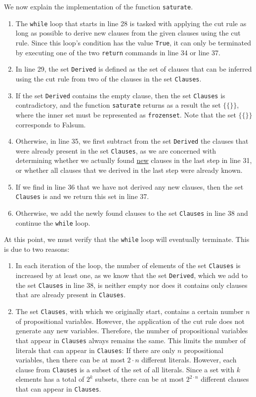 We now explain the implementation of the function \texttt{saturate}.
\begin{enumerate}
\item The \texttt{while} loop that starts in line 28 is tasked with applying the cut rule
      as long as possible to derive new clauses from the given
      clauses using the cut rule. Since this loop's condition has the value \texttt{True}, it can only be
      terminated by executing one of the two \texttt{return} commands in line 34 or line 37.
\item In line 29, the set \texttt{Derived} is defined as the set of clauses that can be inferred using the
      cut rule from two of the clauses in the set \texttt{Clauses}.
\item If the set \texttt{Derived} contains the empty clause, then the set
      \texttt{Clauses} is contradictory, and the function \texttt{saturate} returns as a result the
      set $\bigl\{ \{\} \bigr\}$, where the inner set must be represented as \texttt{frozenset}. Note that the set $\bigl\{ \{\} \bigr\}$ corresponds to Falsum.
\item Otherwise, in line 35, we first subtract from the set \texttt{Derived} the clauses
      that were already present in the set \texttt{Clauses}, as we are concerned
      with determining whether we actually found 
      \underline{new} clauses in the last step in line 31, or whether all clauses that we derived in the last step were already known.
\item If we find in line 36 that we have not derived any new clauses,
      then the set \texttt{Clauses} is  and we return this set in line 37.
\item Otherwise, we add the newly found clauses to the set
      \texttt{Clauses} in line 38  and continue the \texttt{while} loop.
\end{enumerate}
At this point, we must verify that the \texttt{while} loop will eventually
terminate. This is due to two reasons:
\begin{enumerate}
\item In each iteration of the loop, the number of elements of the set \texttt{Clauses}
      is increased by at least one, as we know that the set \texttt{Derived}, which we add to the
      set \texttt{Clauses} in line 38, is neither empty nor does it contains only
      clauses that are already present in \texttt{Clauses}.
\item The set \texttt{Clauses}, with which we originally start, contains a certain number $n$
      of propositional variables. However, the application of the cut rule does not generate any new
      variables. Therefore, the number of propositional variables that appear in
      \texttt{Clauses} always remains the same. This limits the number of literals
      that can appear in \texttt{Clauses}: If there are only $n$ propositional variables,
      then there can be at most $2 \cdot n$ different literals.  However, each clause from \texttt{Clauses} is
      a subset of the set of all literals.  Since a set with $k$ elements has a total of $2^k$
      subsets, there can be at most $2^{2 \cdot n}$ different clauses that can appear in
      \texttt{Clauses}.
\end{enumerate}
